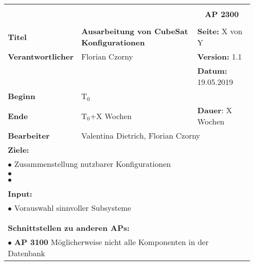 \clearpage
\begin{table}[!h]
 \begin{center}
  \begin{tabular}{|p{35mm}||p{55mm}|p{50mm}||p{40mm}|}
   \hline
   \multicolumn{3}{|l||}{\textbf{}} & \multicolumn{1}{c|}{}\\
   \multicolumn{3}{|l||}{\textbf{}} & \multicolumn{1}{c|}{\textbf{AP 2300}}\\
   \multicolumn{3}{|l||}{\textbf{}} & \multicolumn{1}{c|}{}\\
   \hline\hline
   \textbf{Titel} & \multicolumn{2}{p{7cm}||}{\textbf{Ausarbeitung von CubeSat Konfigurationen}} & \textbf{Seite:} X von Y\\
   \hline
   \textbf{Verantwortlicher} & \multicolumn{2}{l||}{Florian Czorny} & \textbf{Version:} 1.1\\
   \hline
   \multicolumn{3}{|l||}{} & \textbf{Datum:} 19.05.2019\\
   \hline\hline
   \textbf{Beginn} & \multicolumn{2}{l||}{T$_0$} & \\
   \hline
   \textbf{Ende} & \multicolumn{2}{l||}{T$_0$+X Wochen} & \textbf{Dauer}: X Wochen\\
   \hline\hline
   \textbf{Bearbeiter} & \multicolumn{3}{l|}{Valentina Dietrich, Florian Czorny}\\
   \hline\hline
   \multicolumn{4}{|p{150mm}|}{\textbf{Ziele:}}\\
   \multicolumn{4}{|p{150mm}|}{$\bullet$ Zusammenstellung nutzbarer Konfigurationen}\\
   \multicolumn{4}{|p{150mm}|}{$\bullet$ }\\
   \multicolumn{4}{|p{150mm}|}{$\bullet$ }\\
   \multicolumn{4}{|p{150mm}|}{}\\
   \multicolumn{4}{|p{150mm}|}{\textbf{Input:}}\\
   \multicolumn{4}{|p{150mm}|}{$\bullet$ Vorauswahl sinnvoller Subsysteme}\\
   \multicolumn{4}{|p{150mm}|}{}\\
   \multicolumn{4}{|p{150mm}|}{}\\
   \multicolumn{4}{|p{150mm}|}{\textbf{Schnittstellen zu anderen APs:}}\\
   \multicolumn{4}{|p{150mm}|}{$\bullet$ \textbf{AP 3100} Möglicherweise nicht alle Komponenten in der Datenbank}\\

\end{tabular}
\end{center}
\end{table}
